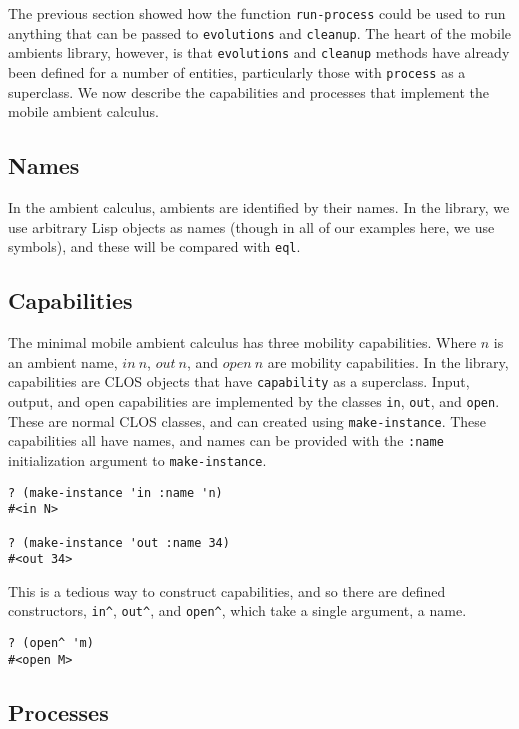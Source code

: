 \documentclass[12pt]{article}
\begin{document}
The previous section showed how the function \texttt{run-process} could be used to run anything that can be passed to \texttt{evolutions} and \texttt{cleanup}.
The heart of the mobile ambients library, however, is that \texttt{evolutions} and \texttt{cleanup} methods have already been defined for a number of entities, particularly those with \texttt{process} as a superclass.
We now describe the capabilities and processes that implement the mobile ambient calculus.

\subsection{Names}
\label{sec:names}

In the ambient calculus, ambients are identified by their names.
In the library, we use arbitrary Lisp objects as names (though in all of our examples here, we use symbols), and these will be compared with \texttt{eql}.

\subsection{Capabilities}
\label{sec:capabilities}

The minimal mobile ambient calculus has three mobility capabilities.
Where $n$ is an ambient name, $\mathit{in}\ n$, $\mathit{out}\ n$, and $\mathit{open}\ n$ are mobility capabilities.
In the library, capabilities are CLOS objects that have \texttt{capability} as a superclass.
Input, output, and open capabilities are implemented by the classes \texttt{in}, \texttt{out}, and \texttt{open}.
These are normal CLOS classes, and can created using \texttt{make-instance}.
These capabilities all have names, and names can be provided with the \texttt{:name} initialization argument to \texttt{make-instance}.

\begin{verbatim}
? (make-instance 'in :name 'n)
#<in N>

? (make-instance 'out :name 34)
#<out 34>
\end{verbatim}

This is a tedious way to construct capabilities, and so there are defined constructors, \texttt{in\^}, \texttt{out\^}, and \texttt{open\^}, which take a single argument, a name.

\begin{verbatim}
? (open^ 'm)
#<open M>
\end{verbatim}

\subsection{Processes}
\label{sec:processes}
\end{document}
